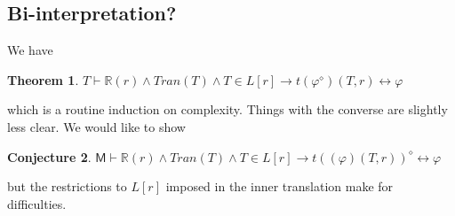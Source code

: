 \documentclass{article}
\newtheorem{Theorem}{Theorem}[section]
\theoremstyle{definition}
\newtheorem{Conjecture}[Theorem]{Conjecture}
\begin{document}
\subsection{Bi-interpretation?}
We have
\begin{Theorem}
    $T \vdash \mathbb{R}(r) \wedge Tran(T) \wedge T \in L[r] \rightarrow t(\varphi^\diamond)(T, r) \leftrightarrow \varphi$
\end{Theorem}
which is a routine induction on complexity. Things with the converse are slightly less clear. We would like
to show
\begin{Conjecture}
    $\mathsf{M} \vdash \mathbb{R}(r) \wedge Tran(T) \wedge T \in L[r] \rightarrow t((\varphi)(T, r))^\diamond \leftrightarrow \varphi$
\end{Conjecture}
but the restrictions to $L[r]$ imposed in the inner translation make for difficulties.
\end{document}
